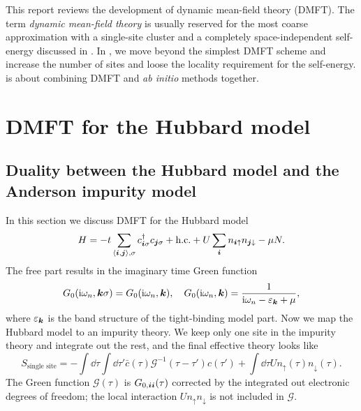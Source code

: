 \documentclass[hyperref, a4paper]{article}
\newcommand*{\ii}{\mathrm{i}}
\newcommand*{\pair}[1]{\langle #1 \rangle}
\begin{document}
This report reviews the development of dynamic mean-field theory (DMFT).
The term \emph{dynamic mean-field theory} is usually reserved for 
the most coarse approximation with a single-site cluster
and a completely space-independent self-energy
discussed in .
In , we move beyond the simplest DMFT scheme 
and increase the number of sites 
and loose the locality requirement for the self-energy.
is about combining DMFT and \textit{ab initio} methods together.

\section{DMFT for the Hubbard model}\label{sec:dmft}

\subsection{Duality between the Hubbard model and the Anderson impurity model}

In this section we discuss DMFT for the Hubbard model
\begin{equation}
    H = - t \sum_{\pair{\vb*{i}, \vb*{j}}, \sigma} c^\dagger_{\vb*{i} \sigma} c_{\vb*{j} \sigma} + \text{h.c.}
    + U \sum_{\vb*{i}} n_{\vb*{i} \uparrow} n_{\vb*{j} \downarrow} - \mu N.
\end{equation}
The free part results in the imaginary time Green function
\begin{equation}
    G_{0}(\ii \omega_n, \vb*{k} \sigma) = G_0(\ii \omega_n, \vb*{k}) , 
    \quad G_0(\ii \omega_n, \vb*{k}) = \frac{1}{\ii \omega_n - \varepsilon_{\vb*{k}} + \mu},
\end{equation}
where $\varepsilon_{\vb*{k}}$ is the band structure of the tight-binding model part.
Now we map the Hubbard model to an impurity theory.
We keep only one site in the impurity theory
and integrate out the rest, 
and the final effective theory looks like
\begin{equation}
    S_{\text{single site}} = 
    - \int \dd{\tau} \int \dd{\tau'} \bar{c}(\tau) \mathcal{G}^{-1}(\tau - \tau') c(\tau') 
    + \int \dd{\tau} U n_{\uparrow}(\tau) n_{\downarrow}(\tau).
    \label{eq:single-site}
\end{equation}
The Green function $\mathcal{G}(\tau)$ is 
$G_{0, \vb*{i} \vb*{i}}(\tau)$ corrected by the integrated out electronic degrees of freedom;
the local interaction $U n_{\uparrow} n_{\downarrow}$ is not included in $\mathcal{G}$.
\end{document}
